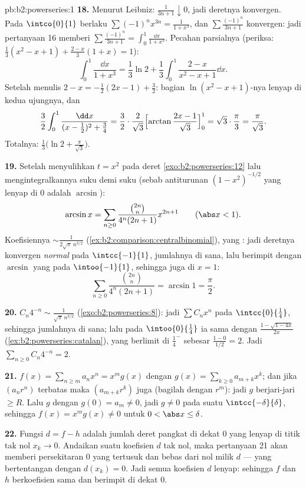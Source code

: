 \begin{solution}{pb:b2:powerseries:1}
\textbf{18.} Menurut Leibniz: $\frac{1}{3n+1}\downarrow0$, jadi deretnya
konvergen. Pada $\intco{0}{1}$ berlaku $\sum(-1)^nx^{3n} =
\frac{1}{1+x^3}$, dan $\sum\frac{(-1)^n}{3n+1}$ konvergen: jadi
pertanyaan 16 memberi $\sum\frac{(-1)^n}{3n+1} =
\int_0^1\frac{\dd x}{1+x^3}$. Pecahan parsialnya (periksa:
$\frac13(x^2-x+1) + \frac{2-x}{3}(1+x) = 1$):
\[
\int_0^1\frac{\dd x}{1+x^3}
= \frac13\ln2 + \frac13\int_0^1\frac{2-x}{x^2-x+1}\dd x .
\]
Setelah menulis $2 - x = -\frac12(2x-1) + \frac32$: bagian
$\ln(x^2-x+1)$-nya lenyap di kedua ujungnya, dan
\[
\frac32\int_0^1\frac{\dd x}{(x-\frac12)^2 + \frac34}
= \frac32\cdot\frac{2}{\sqrt3}
\Bigl[\arctan\frac{2x-1}{\sqrt3}\Bigr]_0^1
= \sqrt3\cdot\frac{\pi}{3} = \frac{\pi}{\sqrt3} .
\]
Totalnya: $\frac13\bigl(\ln2 + \frac{\pi}{\sqrt3}\bigr)$.

\textbf{19.} Setelah menyulihkan $t = x^2$ pada deret
\cref{exo:b2:powerseries:12} lalu mengintegralkannya suku demi
suku (sebab antiturunan $(1-x^2)^{-1/2}$ yang lenyap di $0$ adalah
$\arcsin$):
\[
\arcsin x = \sum_{n\geq0}
\frac{\binom{2n}n}{4^n(2n+1)}x^{2n+1}
\qquad(\abs x < 1) .
\]
Koefisiennya $\sim \frac{1}{2\sqrt\pi\,n^{3/2}}$
(\cref{ex:b2:comparison:centralbinomial}), yang : jadi
deretnya konvergen \emph{normal} pada $\intcc{-1}{1}$, jumlahnya
 di sana, lalu berimpit dengan $\arcsin$ yang 
pada $\intoo{-1}{1}$, sehingga juga di $x = 1$:
\[
\sum_{n\geq0}\frac{\binom{2n}n}{4^n(2n+1)}
= \arcsin 1 = \frac\pi2 .
\]

\textbf{20.} $C_n4^{-n} \sim \frac{1}{\sqrt\pi\,n^{3/2}}$
(\cref{exo:b2:powerseries:8}): jadi  $\sum
C_nx^n$ pada $\intcc{0}{\frac14}$, sehingga jumlahnya 
di sana; lalu pada $\intoo{0}{\frac14}$ ia sama dengan
$\frac{1-\sqrt{1-4x}}{2x}$
(\cref{ex:b2:powerseries:catalan}), yang berlimit di
$\frac14^-$ sebesar $\frac{1-0}{1/2} = 2$. Jadi $\sum_{n\geq0}
C_n4^{-n} = 2$.

\textbf{21.} $f(x) = \sum_{n\geq m}a_nx^n = x^m g(x)$ dengan
$g(x) = \sum_{k\geq0}a_{m+k}x^k$; dan jika $(a_nr^n)$ terbatas maka
$(a_{m+k}r^k)$ juga (bagilah dengan $r^m$): jadi $g$ berjari-jari $\geq
R$. Lalu $g$  dengan $g(0) = a_m \neq 0$, jadi $g \neq 0$
pada suatu $\intcc{-\delta}{\delta}$, sehingga $f(x) = x^mg(x) \neq 0$
untuk $0 < \abs x \leq \delta$.

\textbf{22.} Fungsi $d = f - h$ adalah jumlah deret pangkat di dekat $0$
yang lenyap di titik tak nol $x_k \to 0$. Andaikan suatu
koefisien $d$ tak nol, maka pertanyaan 21 akan memberi
persekitaran $0$ yang tertusuk dan bebas dari nol milik $d$ ---
yang bertentangan dengan $d(x_k) = 0$. Jadi semua koefisien $d$ lenyap:
sehingga $f$ dan $h$ berkoefisien sama dan berimpit di dekat $0$.


\end{solution}
